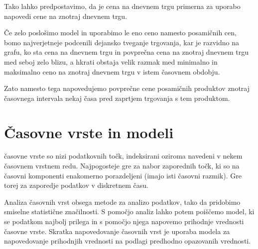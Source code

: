 \documentclass[12pt,a4paper]{amsart}
\theoremstyle{definition} %
\theoremstyle{plain} %
\begin{document}


\pagebreak
Tako lahko predpostavimo, da je cena na dnevnem trgu primerna za uporabo napovedi cene na znotraj dnevnem trgu.

Če zelo poslošimo model in uporabimo le eno ceno namesto posamičnih cen, bomo najverjetneje podcenili dejansko tveganje trgovanja, kar je razvidno na grafu, ko sta cena na dnevnem trgu in povprečna cena na znotraj dnevnem trgu med seboj zelo blizu, a hkrati obstaja velik razmak med minimalno in maksimalno ceno na znotraj dnevnem trgu v istem časovnem obdobju.


Zato namesto tega napovedujemo povprečne cene posamičnih produktov znotraj časovnega intervala nekaj časa pred zaprtjem trgovanja s tem produktom.


\section{Časovne vrste in modeli}

časovne vrste so nizi podatkovnih točk, indeksirani oziroma navedeni v nekem časovnem vrstnem redu. 
Najpogosteje gre za nabor zaporednih točk, ki so na časovni komponenti enakomerno porazdeljeni (imajo isti časovni razmik). Gre torej za zaporedje podatkov v diskretnem času.

Analiza časovnih vrst obsega metode za analizo podatkov, tako da pridobimo smiselne statistične značilnosti. S pomočjo analiz lahko potem poiščemo model, ki se podatkom najbolj prilega in s pomočjo njega napovemo prihodnje vrednosti časovne vrste.
Skratka napovedovanje časovnih vrst je uporaba modela za napovedovanje prihodnjih vrednosti na podlagi predhodno opazovanih vrednosti.
\end{document}
